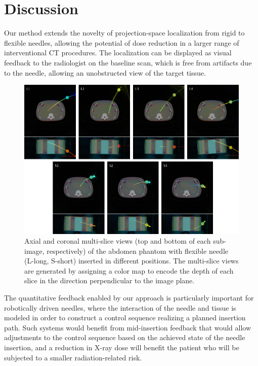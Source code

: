 \section{Discussion}
Our method extends the novelty of projection-space localization from rigid to flexible needles, allowing the potential of dose reduction in a larger range of interventional CT procedures. The localization can be displayed as visual feedback to the radiologist on the baseline scan, which is free from artifacts due to the needle, allowing an unobstructed view of the target tissue.

\begin{figure}
\centering
\includegraphics[width=\textwidth]{multislices.png}
\caption{\small{Axial and coronal multi-slice views (top and bottom of each sub-image, respectively) of the abdomen phantom with flexible needle (L-long, S-short) inserted in different positions. The multi-slice views are generated by assigning a color map to encode the depth of each slice in the direction perpendicular to the image plane.}}
\label{multislices_fig}
\end{figure}

The quantitative feedback enabled by our approach is particularly important for robotically driven needles, where the interaction of the needle and tissue is modeled in order to construct a control sequence realizing a planned insertion path. Such systems would benefit from mid-insertion feedback that would allow adjustments to the control sequence based on the achieved state of the needle insertion, and a reduction in X-ray dose will benefit the patient who will be subjected to a smaller radiation-related risk.


